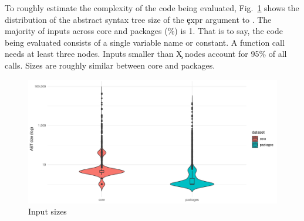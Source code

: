 \documentclass[conference]{IEEEtran}
\begin{document}
\begin{table}[ht] \label{table:site-package-summary}
\caption{Distribution of callsites in CRAN}
\end{table}


To roughly estimate the complexity of the code being evaluated,
Fig.~\ref{fig:ast-size} shows the distribution of the abstract syntax tree
size of the \c{expr} argument to \eval. The majority of inputs across core
and packages (\%) is 1. That is to say, the code being evaluated
consists of a single variable name or constant. A function call needs at
least three nodes. Inputs smaller than \c{X} nodes account for 95\% of all
calls. Sizes are roughly similar between core and packages.

\begin{figure}[htbp]
\includegraphics[width=\columnwidth]{ast_sizes}
\caption{Input sizes} \label{fig:ast-size}
\end{figure}
\end{document}
